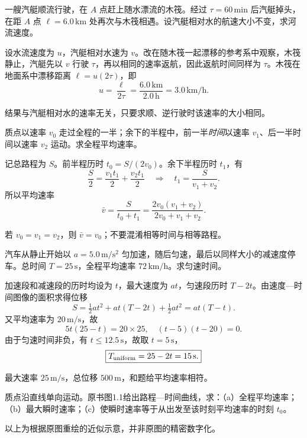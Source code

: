 一艘汽艇顺流行驶，在 $A$ 点赶上随水漂流的木筏。经过 $\tau=60\,\mathrm{min}$ 后汽艇掉头，在距 $A$ 点 $\ell=6.0\,\mathrm{km}$ 处再次与木筏相遇。设汽艇相对水的航速大小不变，求河流速度。

\exsolution
设水流速度为 $u$，汽艇相对水速为 $v$。改在随木筏一起漂移的参考系中观察，木筏静止，汽艇先以 $v$ 行驶 $\tau$，再以相同的速率返航，因此返航时间同样为 $\tau$。木筏在地面系中漂移距离 $\ell=u(2\tau)$，即
\[
\boxed{u=\frac{\ell}{2\tau}=\frac{6.0\,\mathrm{km}}{2.0\,\mathrm h}=3.0\,\mathrm{km/h}.}
\]

\excheck
结果与汽艇相对水的速率无关，只要求顺、逆行驶时该速率的大小相同。


质点以速率 $v_0$ 走过全程的一半；余下的半程中，前一半\emph{时间}以速率 $v_1$、后一半时间以速率 $v_2$ 运动。求全程平均速率。

\exsolution
记总路程为 $S$。前半程历时 $t_0=S/(2v_0)$。余下半程历时 $t_1$，有
\[
\frac S2=\frac{v_1t_1}2+\frac{v_2t_1}2
\quad\Longrightarrow\quad t_1=\frac{S}{v_1+v_2}.
\]
所以平均速率
\[
\boxed{\bar v=\frac{S}{t_0+t_1}
=\frac{2v_0(v_1+v_2)}{2v_0+v_1+v_2}.}
\]

\excheck
若 $v_0=v_1=v_2$，则 $\bar v=v_0$；不要混淆相等时间与相等路程。


汽车从静止开始以 $a=5.0\,\mathrm{m/s^2}$ 匀加速，随后匀速，最后以同样大小的减速度停车。总时间 $T=25\,\mathrm s$，全程平均速率 $72\,\mathrm{km/h}$。求匀速时间。

\exsolution
加速段和减速段的历时均设为 $t$，最大速度为 $at$，匀速段历时 $T-2t$。由速度—时间图像的面积求得位移
\[
S=\tfrac12at^2+at(T-2t)+\tfrac12at^2=at(T-t).
\]
又平均速率为 $20\,\mathrm{m/s}$，故
\[
5t(25-t)=20\times25,\quad(t-5)(t-20)=0.
\]
由于匀速时间非负，有 $t\le12.5\,\mathrm s$，故取 $t=5\,\mathrm s$，
\[
\boxed{T_{\rm uniform}=25-2t=15\,\mathrm s.}
\]

\excheck
最大速率 $25\,\mathrm{m/s}$，总位移 $500\,\mathrm m$，和题给平均速率相符。


质点沿直线单向运动。原书图1.1给出路程—时间曲线，求：（a）全程平均速率；（b）最大瞬时速率；（c）使瞬时速率等于从出发至该时刻平均速率的时刻 $t_0$。
\begin{center}
\end{center}
以上为根据原图重绘的近似示意，并非原图的精密数字化。

